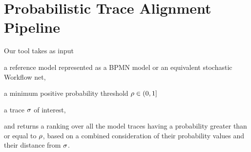 
\section{Probabilistic Trace Alignment Pipeline}
Our tool takes as input
\begin{inparaenum}[\it (i)]
	\item a reference model represented as a BPMN model or an equivalent stochastic Workflow net,
	\item a minimum positive probability threshold $\rho \in (0,1]$
	\item a trace $\sigma$ of interest,
\end{inparaenum}
and returns a ranking over all the model traces having a probability greater than or equal to $\rho$, based on a combined consideration of their probability values and their distance from $\sigma$.


